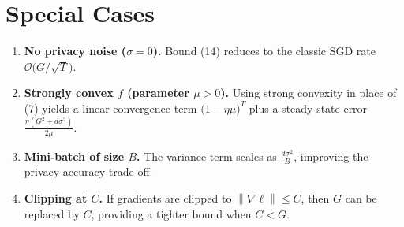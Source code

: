 \documentclass{article}
\newcommand{\norm}[1]{\left\|#1\right\|}
\begin{document}
\section*{Special Cases}
\begin{enumerate}[label=\textbf{Case \arabic*:},leftmargin=*]
\item \textbf{No privacy noise ($\sigma=0$).} Bound (14) reduces to the classic SGD rate $\mathcal{O}\big(G/\sqrt{T}\big)$.
\item \textbf{Strongly convex $f$ (parameter $\mu>0$).} Using strong convexity in place of (7) yields a linear convergence term $\big(1-\eta\mu\big)^{T}$ plus a steady‑state error $\frac{\eta (G^{2}+d\sigma^{2})}{2\mu}$.
\item \textbf{Mini‑batch of size $B$.} The variance term scales as $\frac{d\sigma^{2}}{B}$, improving the privacy‑accuracy trade‑off.
\item \textbf{Clipping at $C$.} If gradients are clipped to $\norm{\nabla\ell}\le C$, then $G$ can be replaced by $C$, providing a tighter bound when $C<G$.
\end{enumerate}
\end{document}
